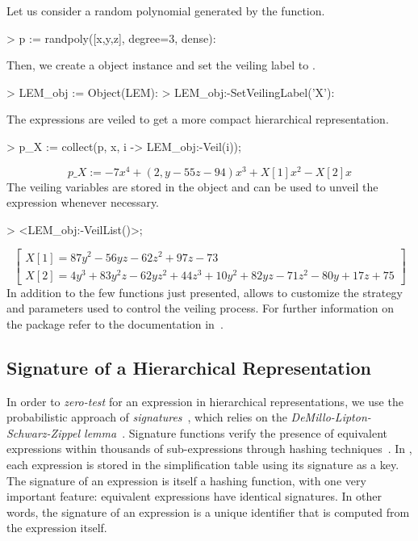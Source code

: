 \begin{example}
  Let us consider a random polynomial  generated by the  function.
  \begin{mapleinline}
> p := randpoly([x,y,z], degree=3, dense):
  \end{mapleinline}
  Then, we create a \LEM{} object instance and set the veiling label to .
  \begin{mapleinline}
> LEM_obj := Object(LEM):
> LEM_obj:-SetVeilingLabel('X'):
  \end{mapleinline}
  The expressions are veiled to get a more compact hierarchical representation.
  \begin{mapleinline}
> p_X := collect(p, x, i -> LEM_obj:-Veil(i));
  \end{mapleinline}
  \begin{equation*}
    p\_X := -7x^4 + (2,y - 55z - 94)x^3 + X[1]x^2 - X[2]x
  \end{equation*}
  The veiling variables are stored in the \LEM{} object and can be used to unveil the expression whenever necessary.
  \begin{mapleinline}
> <LEM_obj:-VeilList()>;
  \end{mapleinline}
  \begin{equation*}
    \begin{bmatrix}
      X[1] = 87y^2 - 56yz - 62z^2 + 97z - 73 \\[0.2em]
      X[2] = 4y^3 + 83y^2z - 62yz^2 + 44z^3 + 10y^2 + 82yz - 71z^2 - 80y + 17z + 75
    \end{bmatrix}
  \end{equation*}
  In addition to the few functions just presented, \LEM{} allows to customize the strategy and parameters used to control the veiling process. For further information on the \LEM{} package refer to the documentation in~\cite{lem}.
\end{example}

\subsection{Signature of a Hierarchical Representation}
\label{chap3:sec:signature}

In order to \emph{zero-test} for an expression in hierarchical representations, we use the probabilistic approach of \emph{signatures}~\cite{geddes1992algorithms}, which relies on the \emph{DeMillo-Lipton-Schwarz-Zippel lemma}~\cite{demillo1978probabilistic, schwartz1980fast, zippel1979probabilistic}. Signature functions verify the presence of equivalent expressions within thousands of sub-expressions through hashing techniques~\cite{char1984design, gonnet1984determining, gonnet1986results, monagan1994signature}. In \Maple{}, each expression is stored in the simplification table using its signature as a key. The signature of an expression is itself a hashing function, with one very important feature: equivalent expressions have identical signatures. In other words, the signature of an expression is a unique identifier that is computed from the expression itself.

